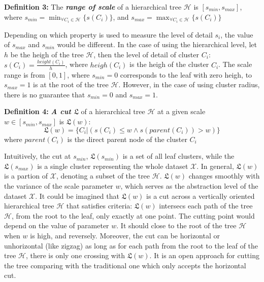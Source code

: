 \textbf{Definition 3:} The \textbf{\textit{range of scale}} of a hierarchical tree $\mathcal{H}$ is $[s_{min},s_{max}]$, where $s_{min} = \min_{\forall C_i \in \mathcal{H}}\{s(C_i)\}$, and $s_{max} = \max_{\forall C_i \in \mathcal{H}}\{s(C_i)\}$

Depending on which property is used to measure the level of detail $s_i$, the value of  $s_{max}$ and  $s_{min}$ would be different. In the case of using the hierarchical level, let $h$ be the heigh of the tree $\mathcal{H}$, then the level of detail of cluster $C_i$: $s(C_i) = \frac{height(C_i)}{h}$, where $heigh(C_i)$ is the heigh of the cluster $C_i$. The scale range is from $[0,1]$, where $s_{min} = 0$ corresponds to the leaf with zero heigh, to $s_{max} = 1$ is at the root of the tree $\mathcal{H}$. However, in the case of using cluster radius, there is no guarantee that $s_{min} = 0$ and $s_{max} = 1$.

\textbf{Definition 4:} \textbf{\textit{A cut $\mathfrak{L}$}} of a hierarchical tree $\mathcal{H}$ at a given scale $w \in [s_{min},s_{max}] $  is $\mathfrak{L}(w)$:
\begin{equation}
\label{equ:a_cut_l}
\mathfrak{L}(w) = \{C_i | (s(C_i) \leq w  \wedge s(parent(C_i)) > w)\}
\end{equation}
where $parent(C_i)$ is the direct parent node of the cluster $C_i$

Intuitively, the cut at $s_{min}$, $\mathfrak{L}(s_{min})$ is a set of all leaf clusters, while the $\mathfrak{L}(s_{max})$ is a single cluster representing the whole dataset $\mathcal{X}$. In general, $\mathfrak{L}(w)$ is a partion of $\mathcal{X}$, denoting a subset of the tree $\mathcal{H}$. $\mathfrak{L}(w)$ changes smoothly with the variance of the scale parameter $w$, which serves as the abstraction level of the dataset $\mathcal{X}$. It could be imagined that $\mathfrak{L}(w)$ is a cut across a vertically oriented hierarchical tree $\mathcal{H}$ that satisfies criteria: $\mathfrak{L}(w)$ intersecs each path of the tree $\mathcal{H}$, from the root to the leaf, only exactly at one point. The cutting point would depend on the value of parameter $w$. It should close to the root of the tree $\mathcal{H}$ when $w$ is high, and reversely. Moreover, the cut can be horizontal or unhorizontal (like zigzag) as long as for each path from the root to the leaf of the tree $\mathcal{H}$, there is only one crossing with $\mathfrak{L}(w)$. It is an open approach for cutting the tree comparing with the traditional one which only accepts the horizontal cut. 

